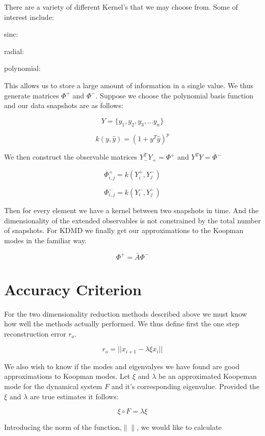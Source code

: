There are a variety of different Kernel's that we may choose from. Some of interest include:

sinc:

\vspace{3mm}

radial: 

\vspace{3mm}


polynomial:

\vspace{3mm}

This allows us to store a large amount of information in a single value. We thus generate matrices
$\Phi^+$ and $\Phi^-$. Suppose we choose the polynomial basis function and our data snapshots are as
follows:

$$
 Y = \{y_1,y_2,y_3, \dots y_n\}
$$

$$
k (y,{\hat y}) = (1 + y^T {\hat y})^p
$$

We then construct the observable matrices $Y^T_-Y_+ = \Phi^{+}$ and $Y^T Y = \Phi^{-}$

$$
\Phi^{+}_{i,j} = k(Y^{+}_{i}, Y^{-}_j)
$$

$$
\Phi^{-}_{i,j} = k(Y^{-}_{i}, Y^{-}_j)
$$

Then for every element we have a kernel between two snapshots in time. And the dimensionality of the
extended observables is not constrained by the total number of snapshots. For KDMD we finally get
our approximations to the Koopman modes in the familiar way.

$$
\Phi^{+} = {\bar A} \Phi^{-}
$$

\section{Accuracy Criterion}
For the two dimensionality reduction methods described above we must know how 
well the methods actually performed. We thus define first the one step reconstruction
error $r_o$.

$$
r_o = ||x_{i+1} - \lambda \xi x_{i} ||
$$

We also wish to know if the modes and eigenvalyes we have found are good approximations to 
Koopman modes. Let $\xi$ and $\lambda$ be an approximated Koopeman mode for the 
dynamical system $F$ and it's corresponding eigenvalue. Provided the $\xi$ and $\lambda$ are true estimates
it follows:

$$
\xi \circ F = \lambda \xi
$$

Introducing the norm of the function,$\|\|$, we would like to calculate 

